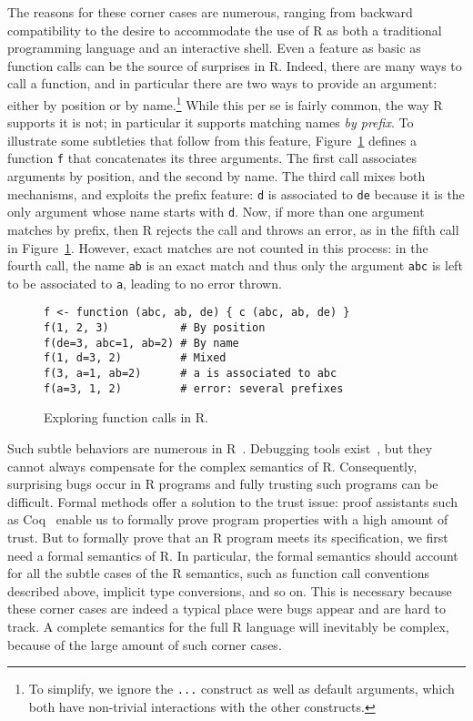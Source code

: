 \documentclass[
    sigplan,
    10pt,
    review, %
    natbib=false %
 ]{acmart}
\newcommand\et[1]{\todo[color=blue!20,size=\scriptsize]{#1}}
\begin{document}
The reasons for these corner cases are numerous, ranging from backward compatibility to the desire to accommodate the use of R as both a traditional programming language and an interactive shell.
Even a feature as basic as function calls can be the source of surprises in R. 
Indeed, there are many ways to call a function, and in particular there are two ways to provide an argument: either by position or by name.\footnote{
    To simplify, we ignore the \texttt{...} construct
    as well as default arguments, which both have non-trivial interactions with the other constructs.} While this per se is fairly common, the way R supports it is not; in particular it supports matching names {\em by prefix}. 
% 
To illustrate some subtleties that follow from this feature, 
Figure~\ref{fig:calls} defines a function \texttt{f} that concatenates its three arguments. The first call associates arguments by position, and the second by name. The third call mixes both mechanisms, and exploits the prefix feature: \texttt{d} is associated to \texttt{de}
because it is the only argument whose name starts with \texttt{d}.
Now, if more than one argument matches by prefix,
then R rejects the call and throws an error,
as in the fifth call in Figure~\ref{fig:calls}.
However, exact matches are not counted in this process:
in the fourth call,
the name \texttt{ab} is an exact match
and thus only the argument \texttt{abc}
is left to be associated to \texttt{a},
leading to no error thrown.

\begin{figure}[t]
\begin{verbatim}
f <- function (abc, ab, de) { c (abc, ab, de) }
f(1, 2, 3)           # By position
f(de=3, abc=1, ab=2) # By name
f(1, d=3, 2)         # Mixed
f(3, a=1, ab=2)      # a is associated to abc
f(a=3, 1, 2)         # error: several prefixes
\end{verbatim}
\caption{Exploring function calls in R.}
\label{fig:calls}
\end{figure}

Such subtle behaviors are numerous in R~\parencite{RInferno}.
Debugging tools exist~\parencite{mcpherson2014},
but they cannot always compensate for the complex semantics of R.
Consequently, surprising bugs occur in R programs
and fully trusting such programs can be difficult.
%
Formal methods offer a solution to the trust issue:
proof assistants such as Coq~\parencite{Coq} enable us
to formally prove program properties with a high amount of trust.
But to formally prove that an R program meets its specification,
we first need a formal semantics of R. \et{mention the on-going spec effort and its limits} 
In particular, the formal semantics should account for all the subtle cases of the R semantics, such as function call conventions described above, implicit type conversions, and so on.
This is necessary because these corner cases are indeed a typical place were bugs appear and are hard to track. 
A complete semantics for the full R language will inevitably be complex,
because of the large amount of such corner cases.
\end{document}

